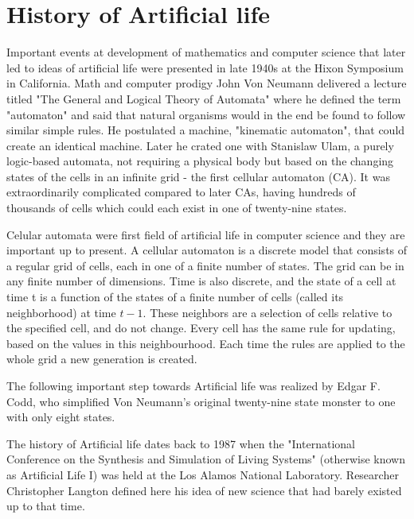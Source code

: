 \documentclass[a4paper,12pt]{report}
\begin{document}
\section{History of Artificial life}

Important events at development of mathematics and computer science that later led to ideas of artificial life were presented in late 1940s at the Hixon Symposium in California. Math and computer prodigy John Von Neumann delivered a lecture titled "The General and Logical Theory of Automata" where he defined the term "automaton" and said that natural organisms would in the end be found to follow similar simple rules. He postulated a machine, "kinematic automaton", that could create an identical machine. Later he crated one with Stanislaw Ulam, a purely logic-based automata, not requiring a physical body but based on the changing states of the cells in an infinite grid - the first cellular automaton (CA). It was extraordinarily complicated compared to later CAs, having hundreds of thousands of cells which could each exist in one of twenty-nine states.
 
Celular automata were first field of artificial life in computer science and they are important up to present. A cellular automaton is a discrete model that consists of a regular grid of cells, each in one of a finite number of states. The grid can be in any finite number of dimensions. Time is also discrete, and the state of a cell at time t is a function of the states of a finite number of cells (called its neighborhood) at time $t - 1$. These neighbors are a selection of cells relative to the specified cell, and do not change. Every cell has the same rule for updating, based on the values in this neighbourhood. Each time the rules are applied to the whole grid a new generation is created.\cite{Delorme} 

The following important step towards Artificial life was realized by Edgar F. Codd, who simplified Von Neumann's original twenty-nine state monster to one with only eight states.
 
The history of Artificial life dates back to 1987 when the "International Conference on the Synthesis and Simulation of Living Systems" (otherwise known as Artificial Life I) was held at the Los Alamos National Laboratory. Researcher Christopher Langton defined here his idea of new science that had barely existed up to that time.
 
\end{document}
